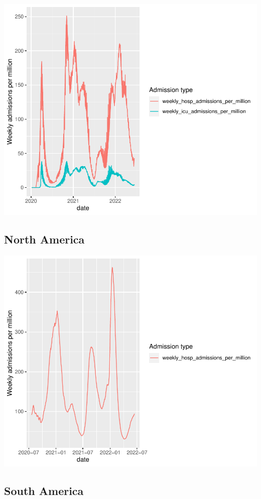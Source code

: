 \documentclass[11pt,preprint, authoryear]{elsarticle}
\numberwithin{equation}{section}
\numberwithin{figure}{section}
\numberwithin{table}{section}
\begin{document}
\includegraphics{Question1_files/figure-latex/unnamed-chunk-4-1.pdf}

\hypertarget{north-america}{%
\subsection{North America}\label{north-america}}

\includegraphics{Question1_files/figure-latex/unnamed-chunk-5-1.pdf}

\hypertarget{south-america}{%
\subsection{South America}\label{south-america}}
\end{document}
